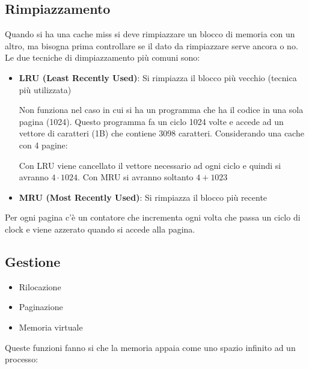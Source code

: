 \documentclass[a4paper]{article}
\theoremstyle{break}
\theoremstyle{break}
\theoremstyle{break}
\theoremstyle{break}
\begin{document}
\subsection{Rimpiazzamento}
Quando si ha una cache miss si deve rimpiazzare un blocco di memoria con un altro, ma
bisogna prima controllare se il dato da rimpiazzare serve ancora o no.
Le due tecniche di dimpiazzamento più comuni sono:
\begin{itemize}
  \item \textbf{LRU (Least Recently Used)}: Si rimpiazza il blocco più vecchio (tecnica più utilizzata)

    \vspace{1em}
    \noindent Non funziona nel caso in cui si ha un programma che ha il codice in una sola
    pagina (1024). Questo programma fa un ciclo 1024 volte e accede ad un vettore di caratteri (1B)
    che contiene 3098 caratteri. Considerando una cache con 4 pagine:
    \begin{figure}[H]
      \centering
    \end{figure}

    \noindent Con LRU viene cancellato il vettore necessario ad ogni ciclo e quindi
    si avranno \( 4 \cdot 1024 \). Con MRU si avranno soltanto \( 4 + 1023 \) 
  \item \textbf{MRU (Most Recently Used)}: Si rimpiazza il blocco più recente
\end{itemize}
Per ogni pagina c'è un contatore che incrementa ogni volta che passa un ciclo di clock
e viene azzerato quando si accede alla pagina.

\subsection{Gestione}
\begin{itemize}
  \item Rilocazione
  \item Paginazione
  \item Memoria virtuale
\end{itemize}
Queste funzioni fanno si che la memoria appaia come uno spazio infinito ad un processo:
\end{document}
